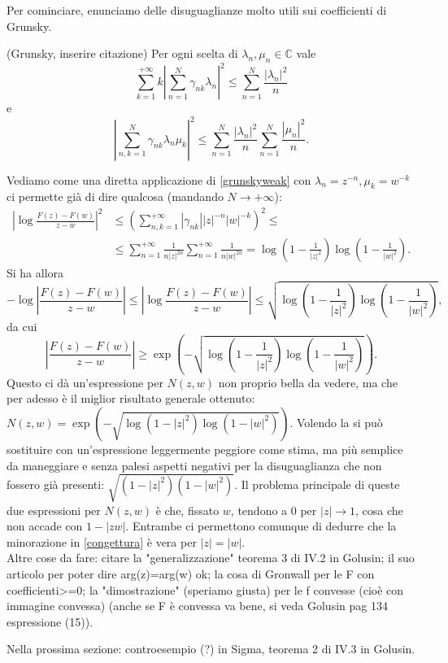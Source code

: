 Per cominciare, enunciamo delle disuguaglianze molto utili sui coefficienti di Grunsky.
\begin{thm}
  (Grunsky, inserire citazione) Per ogni scelta di $\lambda_n, \mu_n \in \mathbb{C}$ vale
  \begin{equation}\label{grunskystrong}
    \sum_{k=1}^{+\infty} k\left|\sum_{n=1}^N\gamma_{nk}\lambda_n\right|^2 \le \sum_{n=1}^N \frac{|\lambda_n|^2}{n}
  \end{equation}
  e
  \begin{equation}\label{grunskyweak}
    \left|\sum_{n,k=1}^N \gamma_{nk}\lambda_n\mu_k\right|^2 \le \sum_{n=1}^N \frac{|\lambda_n|^2}{n}\sum_{n=1}^N \frac{|\mu_n|^2}{n}.
  \end{equation}
\end{thm}
Vediamo come una diretta applicazione di \eqref{grunskyweak} con $\lambda_n=z^{-n},\mu_k=w^{-k}$ ci permette già di dire qualcosa (mandando $N \longrightarrow +\infty$):
\begin{align*}
  \left|\log{\frac{F(z)-F(w)}{z-w}}\right|^2 &\le \left(\sum_{n,k=1}^{+\infty} |\gamma_{nk}||z|^{-n}|w|^{-k}\right)^2 \le \\
  &\le \sum_{n=1}^{+\infty} \frac{1}{n|z|^{2n}}\sum_{n=1}^{+\infty} \frac{1}{n|w|^{2n}}=\log\left(1-\frac{1}{|z|^2}\right)\log\left(1-\frac{1}{|w|^2}\right).
\end{align*}
Si ha allora
$$-\log{\left|\frac{F(z)-F(w)}{z-w}\right|} \le \left|\log{\frac{F(z)-F(w)}{z-w}}\right| \le \sqrt{\log\left(1-\frac{1}{|z|^2}\right)\log\left(1-\frac{1}{|w|^2}\right)},$$
da cui
$$\left|\frac{F(z)-F(w)}{z-w}\right| \ge \exp\left(-\sqrt{\log\left(1-\frac{1}{|z|^2}\right)\log\left(1-\frac{1}{|w|^2}\right)}\right).$$
Questo ci dà un'espressione per $N(z,w)$ non proprio bella da vedere, ma che per adesso è il miglior risultato generale ottenuto: \\
$N(z,w)=\exp\left(-\sqrt{\log\left(1-|z|^2\right)\log\left(1-|w|^2\right)}\right)$. Volendo la si può sostituire con un'espressione leggermente peggiore come stima, ma più semplice da maneggiare e senza palesi aspetti negativi per la disuguaglianza che non fossero già presenti: $\sqrt{(1-|z|^2)(1-|w|^2)}$. Il problema principale di queste due espressioni per $N(z,w)$ è che, fissato $w$, tendono a $0$ per $|z| \longrightarrow 1$, cosa che non accade con $1-|zw|$. Entrambe ci permettono comunque di dedurre che la minorazione in \eqref{congettura} è vera per $|z|=|w|$. \\

Altre cose da fare: citare la "generalizzazione" teorema 3 di IV.2 in Golusin; il suo articolo per poter dire arg(z)=arg(w) ok; la cosa di Gronwall per le F con coefficienti>=0; la "dimostrazione" (speriamo giusta) per le f convesse (cioè con immagine convessa) (anche se F è convessa va bene, si veda Golusin pag 134 espressione (15)).

Nella prossima sezione: controesempio (?) in Sigma, teorema 2 di IV.3 in Golusin.
